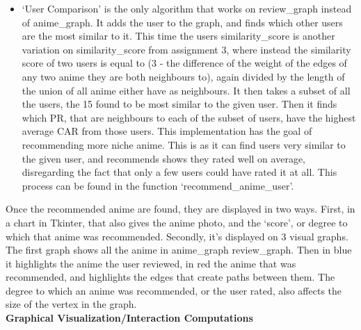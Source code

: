 \documentclass[fontsize=11pt]{article}
\begin{document}
\begin{itemize}
    \item ‘User Comparison’ is the only algorithm that works on review\_graph instead of anime\_graph. It adds the user to the graph, and finds which other users are the most similar to it. This time the users similarity\_score is another variation on similarity\_score from assignment 3, where instead the similarity score of two users is equal to (3 - the difference of the weight of the edges of any two anime they are both neighbours to), again divided by the length of the union of all anime either have as neighbours. It then takes a subset of all the users, the 15 found to be most similar to the given user. Then it finds which PR, that are neighbours to each of the subset of users, have the highest average CAR from those users. This implementation has the goal of recommending more niche anime. This is as it can find users very similar to the given user, and recommends shows they rated well on average, disregarding the fact that only a few users could have rated it at all. This process can be found in the function `recommend\_anime\_user'. 
\end{itemize}

\item[]Once the recommended anime are found, they are displayed in two ways. First, in a chart in Tkinter, that also gives the anime photo, and the ‘score’, or degree to which that anime was recommended. Secondly, it’s displayed on 3 visual graphs. The first graph shows all the anime in anime\_graph \/ review\_graph. Then in blue it highlights the anime the user reviewed, in red the anime that was recommended, and highlights the edges that create paths between them. The degree to which an anime was recommended, or the user rated, also affects the size of the vertex in the graph. \\

\textbf{Graphical Visualization/Interaction Computations}\\
\end{document}
